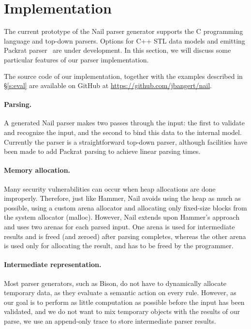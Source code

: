 \section{Implementation}
\label{s:impl}

The current prototype of the Nail parser generator supports the C programming
language and top-down parsers. Options for C++ STL data models and emitting
Packrat parser~\cite{packrat-parsing:icfp02} are under development. In
this section, we will discuss some particular features of our parser
implementation.

The source code of our implementation, together with the examples described in
\S\ref{s:eval} are available on GitHub at \url{https://github.com/jbangert/nail}.



\paragraph{Parsing.}

A generated Nail parser makes two passes through the input: the first to
validate and recognize the input, and the second to bind this data to the internal
model. Currently the parser is a straightforward top-down parser, although
facilities have been made to add Packrat parsing to achieve linear parsing
times.

\paragraph{Memory allocation.}

Many security vulnerabilities can occur when heap allocations are done
improperly. Therefore, just like Hammer, Nail avoids using the heap as much as
possible, using a custom arena allocator and allocating only fixed-size blocks
from the system allocator (malloc). However, Nail extends upon Hammer's approach and uses two
arenas for each parsed input. One arena is used for intermediate results and is
freed (and zeroed) after parsing completes, whereas the other arena is used only
for allocating the result, and has to be freed by the programmer.

\paragraph{Intermediate representation.}

Most parser generators, such as Bison, do not have to dynamically allocate
temporary data, as they evaluate a semantic action on every rule. However, as
our goal is to perform as little computation as possible before the input
has been validated, and we do not want to mix temporary objects with the
results of our parse, we use an append-only trace to store intermediate parser
results. 

